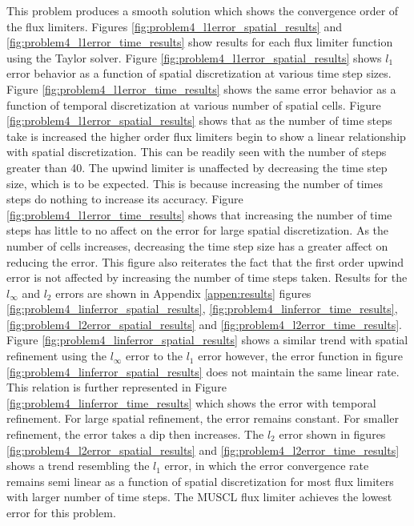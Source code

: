 \noindent This problem produces a smooth solution which shows the convergence order of the flux limiters. Figures \ref{fig:problem4_l1error_spatial_results} and \ref{fig:problem4_l1error_time_results} show results for each flux limiter function using the Taylor solver. Figure \ref{fig:problem4_l1error_spatial_results} shows $l_{1}$ error behavior as a function of spatial discretization at various time step sizes. Figure \ref{fig:problem4_l1error_time_results} shows the same error behavior as a function of temporal discretization at various number of spatial cells. Figure \ref{fig:problem4_l1error_spatial_results} shows that as the number of time steps take is increased the higher order flux limiters begin to show a linear relationship with spatial discretization. This can be readily seen with the number of steps greater than 40. The upwind limiter is unaffected by decreasing the time step size, which is to be expected. This is because increasing the number of times steps do nothing to increase its accuracy. Figure \ref{fig:problem4_l1error_time_results} shows that increasing the number of time steps has little to no affect on the error for large spatial discretization. As the number of cells increases, decreasing the time step size has a greater affect on reducing the error. This figure also reiterates the fact that the first order upwind error is not affected by increasing the number of time steps taken. Results for the $l_{\infty}$ and $l_{2}$ errors are shown in Appendix \ref{appen:results} figures \ref{fig:problem4_linferror_spatial_results}, \ref{fig:problem4_linferror_time_results}, \ref{fig:problem4_l2error_spatial_results} and \ref{fig:problem4_l2error_time_results}. Figure \ref{fig:problem4_linferror_spatial_results} shows a similar trend with spatial refinement using the $l_{\infty}$ error to the $l_{1}$ error however, the error function in figure \ref{fig:problem4_linferror_spatial_results} does not maintain the same linear rate. This relation is further represented in Figure \ref{fig:problem4_linferror_time_results} which shows the error with temporal refinement. For large spatial refinement, the error remains constant. For smaller refinement, the error takes a dip then increases. The $l_{2}$ error shown in figures \ref{fig:problem4_l2error_spatial_results} and \ref{fig:problem4_l2error_time_results} shows a trend resembling the $l_{1}$ error, in which the error convergence rate remains semi linear as a function of spatial discretization for most flux limiters with larger number of time steps. The MUSCL flux limiter achieves the lowest error for this problem.

